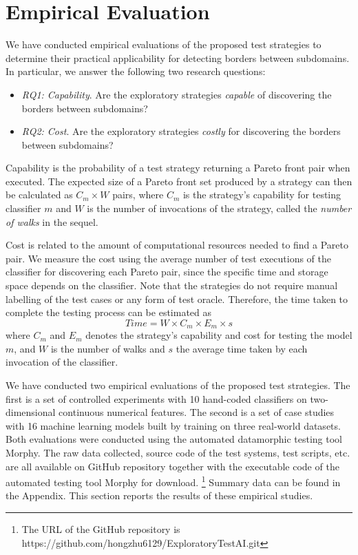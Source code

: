 \documentclass[preprint,1p,authoryear,times]{elsarticle}
\begin{document}
\section{Empirical Evaluation}\label{sec:Evaluation}

We have conducted empirical evaluations of the proposed test strategies to determine their practical applicability for detecting borders between subdomains. In particular, we answer the following two research questions:

\begin{itemize}
\item \emph{RQ1: Capability}. Are the exploratory strategies \emph{capable} of discovering the borders between subdomains? 
\item \emph{RQ2: Cost}. Are the exploratory strategies \emph{costly} for discovering the borders between subdomains? 
\end{itemize}

Capability is the probability of a test strategy returning a Pareto front pair when executed. The expected size of a Pareto front set produced by a strategy can then be calculated as $C_m \times W$ pairs, where $C_m$ is the strategy's capability for testing classifier $m$ and $W$ is the number of invocations of the strategy, called the \emph{number of walks} in the sequel.

Cost is related to the amount of computational resources needed to find a Pareto pair. We measure the cost using the average number of test executions of the classifier for discovering each Pareto pair, since the specific time and storage space depends on the classifier. Note that the strategies do not require manual labelling of the test cases or any form of test oracle. Therefore, the time taken to complete the testing process can be estimated as 
\begin{equation}
Time = W \times C_m \times E_m \times s \label{equ:Time}
\end{equation}
where $C_m$ and $E_m$ denotes the strategy's capability and cost for testing the model $m$, and $W$ is the number of walks and $s$ the average time taken by each invocation of the classifier. 

We have conducted two empirical evaluations of the proposed test strategies. The first is a set of controlled experiments with 10 hand-coded classifiers on two-dimensional continuous numerical features. The second is a set of case studies with 16 machine learning models built by training on three real-world datasets. Both evaluations were conducted using the automated datamorphic testing tool Morphy. The raw data collected, source code of the test systems, test scripts, etc. are all available on GitHub repository together with the executable code of the automated testing tool Morphy for download.
\footnote{The URL of the GitHub repository is https://github.com/hongzhu6129/ExploratoryTestAI.git\label{ftn:GitHubURL}} 
Summary data can be found in the Appendix. This section reports the results of these empirical studies. 
\end{document}
